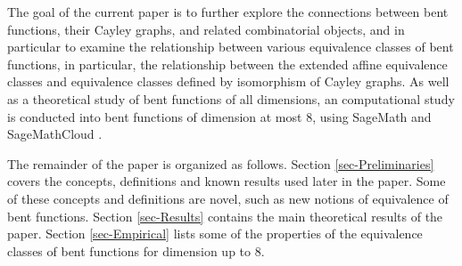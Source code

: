 \documentclass[12pt,a4paper]{article}
\newcommand{\mb}[1]{\mathbb{#1}}
\newcommand{\Z}{\mb{Z}}
\newtheorem{Theorem}{Theorem}
\begin{document}
The goal of the current paper is to further explore the connections between bent functions, their
Cayley graphs, and related combinatorial objects,
and in particular to examine the relationship between various equivalence classes of bent
functions, in particular, the relationship between the extended affine
equivalence classes and equivalence classes defined by isomorphism of Cayley graphs.
As well as a theoretical study of bent functions of all dimensions, an computational study is conducted
into bent functions of dimension at most 8,
using SageMath \cite{SageMath7517} and SageMathCloud \cite{SageMathCloud}.


%
%
The remainder of the paper is organized as follows.
Section \ref{sec-Preliminaries} covers the concepts, definitions and known results used later in the paper.
Some of these concepts and definitions are novel, such as new notions of equivalence of bent
functions.
Section \ref{sec-Results} contains the main theoretical results of the paper.
Section \ref{sec-Empirical} lists some of the properties of the equivalence classes of bent functions for dimension up to 8.
\end{document}
